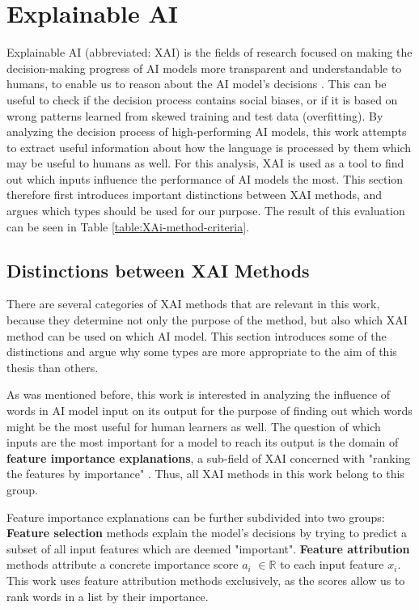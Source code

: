 \section{Explainable AI} \label{sec:explainable-ai}
Explainable AI (abbreviated: XAI) is the fields of research focused on making the decision-making progress of AI models more transparent and understandable to humans, to enable us to reason about the AI model's decisions \cite{viloneNotionsExplainabilityEvaluation2021}.
This can be useful to check if the decision process contains social biases, or if it is based on wrong patterns learned from skewed training and test data (overfitting).
By analyzing the decision process of high-performing AI models, this work attempts to extract useful information about how the language is processed by them which may be useful to humans as well.
For this analysis, XAI is used as a tool to find out which inputs influence the performance of AI models the most.
This section therefore first introduces important distinctions between XAI methods, and argues which types should be used for our purpose.
The result of this evaluation can be seen in Table \ref{table:XAi-method-criteria}.

\subsection{Distinctions between XAI Methods}
There are several categories of XAI methods that are relevant in this work, because they determine not only the purpose of the method, but also which XAI method can be used on which AI model.
This section introduces some of the distinctions and argue why some types are more appropriate to the aim of this thesis than others.

As was mentioned before, this work is interested in analyzing the influence of words in AI model input on its output for the purpose of finding out which words might be the most useful for human learners as well.
The question of which inputs are the most important for a model to reach its output is the domain of \textbf{feature importance explanations}, a sub-field of XAI concerned with "ranking the features by importance" \cite{molnarChapter4Methods2025}.
Thus, all XAI methods in this work belong to this group.

Feature importance explanations can be further subdivided into two groups:
\textbf{Feature selection} methods explain the model's decisions by trying to predict a subset of all input features which are deemed "important".
\textbf{Feature attribution} methods attribute a concrete importance score $a_i$ $\in \mathbb{R}$ to each input feature $x_i$.
This work uses feature attribution methods exclusively, as the scores allow us to rank words in a list by their importance.

